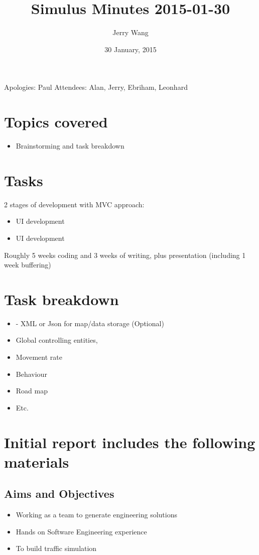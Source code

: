 \documentclass{article}
\author {Jerry Wang}
\title{Simulus Minutes 2015-01-30}
\date {30 January, 2015}
\begin{document}
\maketitle




\noindent Apologies: Paul
\newline 
Attendees: Alan, Jerry, Ebriham, Leonhard 


\section {Topics covered}
\begin{itemize}
\item Brainstorming and task breakdown
\end{itemize}



\section {Tasks}
2 stages of development with MVC approach:
\begin{itemize}
\item UI development
\item UI development
\end{itemize}
Roughly 5 weeks coding and 3 weeks of writing, plus presentation (including 1 week buffering) 



\section {Task breakdown}
\begin{itemize}
\item - XML or Json for map/data storage (Optional)
\item Global controlling entities,
\item	Movement rate 
\item	Behaviour  
\item	Road map
\item Etc.

\end{itemize}



\section {Initial report includes the following materials}
\subsection {Aims and Objectives}
\begin{itemize}
\item Working as a team to generate engineering solutions
\item Hands on Software Engineering experience
\item To build traffic simulation


\end{itemize}
\end{document}
